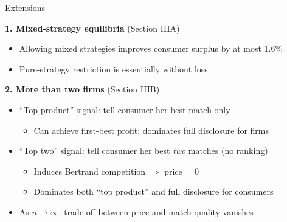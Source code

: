 \documentclass[aspectratio=169, 11pt]{beamer}
\begin{document}
\begin{frame}{Extensions}

\textbf{1. Mixed-strategy equilibria} (Section IIIA)
\begin{itemize}
    \item Allowing mixed strategies improves consumer surplus by at most 1.6\%
    \item Pure-strategy restriction is essentially without loss
\end{itemize}

\bigskip

\textbf{2. More than two firms} (Section IIIB)
\begin{itemize}
    \item ``Top product'' signal: tell consumer her best match only
    \begin{itemize}
        \item Can achieve first-best profit; dominates full disclosure for firms
    \end{itemize}
    \item ``Top two'' signal: tell consumer her best \emph{two} matches (no ranking)
    \begin{itemize}
        \item Induces Bertrand competition $\Rightarrow$ price = 0
        \item Dominates both ``top product'' and full disclosure for consumers
    \end{itemize}
    \item As $n \to \infty$: trade-off between price and match quality vanishes
\end{itemize}

\end{frame}
\end{document}
